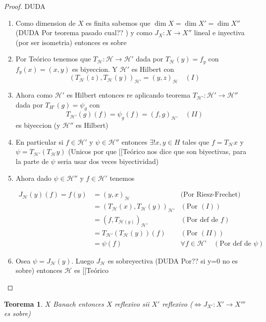 \documentclass[10pt]{extarticle}
\theoremstyle{break}
\newtheorem{theorem}{Teorema}[section]
\theoremstyle{definition}
\begin{document}
\begin{proof} DUDA
\begin{enumerate}
\item
Como dimension de $X$ es finita sabemos que $\dim X=\dim X'=\dim X''$ (DUDA Por teorema pasado cual?? ) y como $J_{X}:X\rightarrow X''$ lineal e inyectiva (por ser isometria) entonces es sobre
\item Por Teórico tenemos que $T_{\mathcal{H}}:\mathcal{H}\rightarrow \mathcal{H}'$ dada por $T_{\mathcal{H}}(y)=f_{y}$ con $f_{y}(x)=(x,y)$ es biyeccion. Y $\mathcal{H}'$ es Hilbert con
$$(T_{\mathcal{H}}(z),T_{\mathcal{H}}(y))_{\mathcal{H}'}=(y,z)_{\mathcal{H}}\quad(I)$$

\item Ahora como $\mathcal{H}'$ es Hilbert entonces re aplicando teorema $T_{\mathcal{H}'}:\mathcal{H}'\rightarrow\mathcal{H}''$ dada por $T_{H'}(g)=\psi_{g}$ con
$$T_{\mathcal{H}'}(g)(f)=\psi_{g}(f)=(f,g)_{\mathcal{H}'}\quad (II)$$
es biyeccion (y $\mathcal{H}''$ es Hilbert)
\item En particular si $f\in \mathcal{H}'$ y $\psi \in \mathcal{H}''$ entonces $\exists !x,y\in H$ tales que $f=T_{\mathcal{H}}x$ y $\psi=T_{\mathcal{H}'}(T_{\mathcal{H}}y)$ (Unicos por que [[Teórico nos dice que son biyectivas, para la parte de $\psi$ seria usar dos veces biyectividad)
\item Ahora dado $\psi \in \mathcal{H}''$ y $f\in \mathcal{H}'$ tenemos

\begin{align*} 
	J_{\mathcal{H}}(y)(f)= f(y)&=(y,x)_{\mathcal{H}} & \text{(Por Riesz-Frechet)}\\
	&=(T_{\mathcal{H}}(x),T_{\mathcal{H}}(y))_{\mathcal{H}'} &(\text{Por } (I))\\ 
	&=(f,T_{\mathcal{H}(y)})_{\mathcal{H}'} & (\text{Por def de }f)\\
	& =T_{\mathcal{H}'}(T_{\mathcal{H}}(y))(f) &(\text{Por } (II)) \\
	&=\psi (f)&\forall f\in \mathcal{H}' \quad(\text{Por def de }\psi)
\end{align*}


\item Osea $\psi = J_{\mathcal{H}}(y)$. Luego $J_{\mathcal{H}}$ es sobreyectiva (DUDA Por?? si y=0 no es sobre) entonces $\mathcal{H}$ es [[Teórico
\end{enumerate}
\end{proof}

\begin{theorem}
$X$ Banach entonces $X$ reflexivo sii $X'$ reflexivo ($\iff J_{X'}:X'\rightarrow X'''$ es sobre)
\end{theorem}
\end{document}
